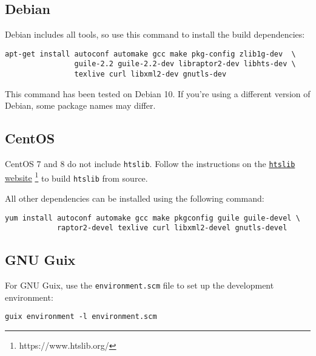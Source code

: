 \subsection{Debian}

  Debian includes all tools, so use this command to install the
  build dependencies:

\begin{siderules}
\begin{verbatim}
apt-get install autoconf automake gcc make pkg-config zlib1g-dev  \
                guile-2.2 guile-2.2-dev libraptor2-dev libhts-dev \
                texlive curl libxml2-dev gnutls-dev
\end{verbatim}
\end{siderules}

  This command has been tested on Debian 10.  If you're using a different
  version of Debian, some package names may differ.

\subsection{CentOS}

  CentOS 7 and 8 do not include \texttt{htslib}.  Follow the instructions on
  the \href{https://www.htslib.org/}{\texttt{htslib} website}%
  \footnote{https://www.htslib.org/} to build \texttt{htslib} from source.

  All other dependencies can be installed using the following command:

\begin{siderules}
\begin{verbatim}
yum install autoconf automake gcc make pkgconfig guile guile-devel \
            raptor2-devel texlive curl libxml2-devel gnutls-devel
\end{verbatim}
\end{siderules}

\subsection{GNU Guix}

  For GNU Guix, use the \texttt{environment.scm} file to set up the development
  environment:

\begin{siderules}
\begin{verbatim}
guix environment -l environment.scm
\end{verbatim}
\end{siderules}

